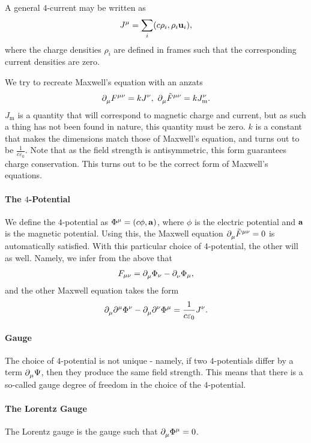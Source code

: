 A general $4$-current may be written as
\begin{align*}
	J^{\mu} = \sum\limits_{i}(c\rho_{i}, \rho_{i}\vb{u}_{i}),
\end{align*}
where the charge densities $\rho_{i}$ are defined in frames such that the corresponding current densities are zero.

We try to recreate Maxwell's equation with an anzats
\begin{align*}
	\del{\mu}{F^{\mu\nu}} = kJ^{\nu},\ \del{\mu}{\tilde{F}^{\mu\nu}} = kJ_{\text{m}}^{\nu}.
\end{align*}
$J_{\text{m}}$ is a quantity that will correspond to magnetic charge and current, but as such a thing has not been found in nature, this quantity must be zero. $k$ is a constant that makes the dimensions match those of Maxwell's equation, and turns out to be $\frac{1}{c\varepsilon_{0}}$. Note that as the field strength is antisymmetric, this form guarantees charge conservation. This turns out to be the correct form of Maxwell's equations.

\paragraph{The $4$-Potential}
We define the $4$-potential as $\Phi^{\mu} = (c\phi, \vb{a})$, where $\phi$ is the electric potential and $\vb{a}$ is the magnetic potential. Using this, the Maxwell equation $\del{\mu}{\tilde{F}^{\mu\nu}} = 0$ is automatically satisfied. With this particular choice of $4$-potential, the other will as well. Namely, we infer from the above that 
\begin{align*}
	F_{\mu\nu} = \del{\mu}{\Phi_{\nu}} - \del{\nu}{\Phi_{\mu}},
\end{align*}
and the other Maxwell equation takes the form
\begin{align*}
	\del{\mu}{\del[\mu]{}{\Phi^{\nu}}} - \del{\mu}{\del[\nu]{}{\Phi^{\mu}}} = \frac{1}{c\varepsilon_{0}}J^{\nu}.
\end{align*}

\paragraph{Gauge}
The choice of $4$-potential is not unique - namely, if two $4$-potentials differ by a term $\del{\mu}{\Psi}$, then they produce the same field strength. This means that there is a so-called gauge degree of freedom in the choice of the $4$-potential.

\paragraph{The Lorentz Gauge}
The Lorentz gauge is the gauge such that $\del{\mu}{\Phi^{\mu}} = 0$.

